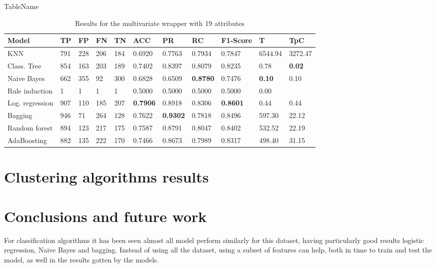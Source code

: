 \documentclass[a4paper,11pt]{article}
\begin{document}
\begin{table}
\centering
\caption{TableName}
\begin{tabular}{|l|l|l|l|l|l|l|l|l|l|l|}
\hline

\textbf{Model} & \textbf{TP} & \textbf{FP} & \textbf{FN} & \textbf{TN} & \textbf{ACC} & \textbf{PR} & \textbf{RC} & \textbf{F1-Score} & \textbf{T} & \textbf{TpC} \\ \hline
KNN & 791 & 228 & 206 & 184 & 0.6920 & 0.7763 & 0.7934 & 0.7847 & 6544.94 & 3272.47 \\ \hline
Class. Tree & 854 & 163 & 203 & 189 & 0.7402 & 0.8397 & 0.8079 & 0.8235 & 0.78 & \textbf{0.02} \\ \hline
Naive Bayes & 662 & 355 & 92 & 300 & 0.6828 & 0.6509 & \textbf{0.8780} & 0.7476 & \textbf{0.10} & 0.10 \\ \hline
Rule induction & 1 & 1 & 1 & 1 & 0.5000 & 0.5000 & 0.5000 & 0.5000 & 0.00 \\ \hline
Log. regression & 907 & 110 & 185 & 207 & \textbf{0.7906} & 0.8918 & 0.8306 & \textbf{0.8601} & 0.44 & 0.44 \\ \hline
Bagging & 946 & 71 & 264 & 128 & 0.7622 & \textbf{0.9302} & 0.7818 & 0.8496 & 597.30 & 22.12 \\ \hline
Random forest & 894 & 123 & 217 & 175 & 0.7587 & 0.8791 & 0.8047 & 0.8402 & 532.52 & 22.19 \\ \hline
AdaBoosting & 882 & 135 & 222 & 170 & 0.7466 & 0.8673 & 0.7989 & 0.8317 & 498.40 & 31.15 \\ \hline

\end{tabular}
\caption{Results for the multivariate wrapper with 19 attributes}
\label{class:w75m}
\end{table}

\section{Clustering algorithms results}

\section{Conclusions and future work}

For classification algorithms it has been seen almost all model perform similarly for this dataset, having particularly good results logistic regression, Naive Bayes and bagging. Instead of using all the dataset, using a subset of features can help, both in time to train and test the model, as well in the results gotten by the models.
\end{document}
